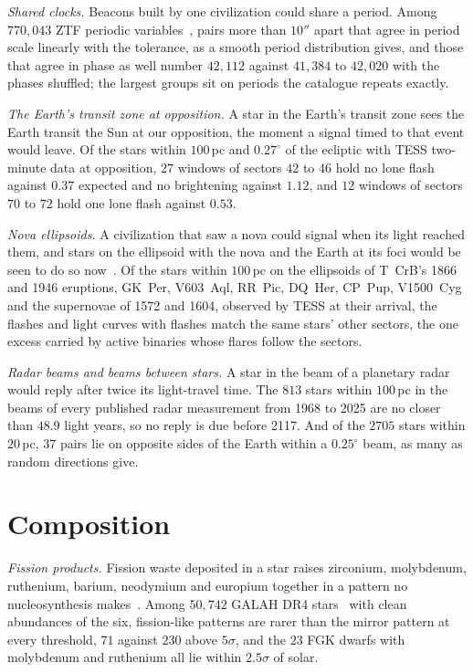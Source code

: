\documentclass[3p,11pt]{elsarticle}
\begin{document}
\emph{Shared clocks.} Beacons built by one civilization could share a period. Among
$770{,}043$ ZTF periodic variables~\cite{Chen2020}, pairs more than $10''$ apart that agree
in period scale linearly with the tolerance, as a smooth period distribution gives, and
those that agree in phase as well number $42{,}112$ against $41{,}384$ to $42{,}020$ with
the phases shuffled; the largest groups sit on periods the catalogue repeats exactly.

\emph{The Earth's transit zone at opposition.} A star in the Earth's transit zone sees the
Earth transit the Sun at our opposition, the moment a signal timed to that event would
leave. Of the stars within $100$\,pc and $0.27^\circ$ of the ecliptic with TESS two-minute
data at opposition, $27$ windows of sectors $42$ to $46$ hold no lone flash against $0.37$
expected and no brightening against $1.12$, and $12$ windows of sectors $70$ to $72$ hold
one lone flash against $0.53$.

\emph{Nova ellipsoids.} A civilization that saw a nova could signal when its light reached
them, and stars on the ellipsoid with the nova and the Earth at its foci would be seen to
do so now~\cite{Davenport2022,Cabrales2024}. Of the stars within $100$\,pc on the ellipsoids of T~CrB's
1866 and 1946 eruptions, GK~Per, V603~Aql, RR~Pic, DQ~Her, CP~Pup, V1500~Cyg and the
supernovae of 1572 and 1604, observed by TESS at their arrival, the flashes and light
curves with flashes match the same stars' other sectors, the one excess carried by
active binaries whose flares follow the sectors.

\emph{Radar beams and beams between stars.} A star in the beam of a planetary radar
would reply after twice its light-travel time. The $813$ stars within $100$\,pc in the
beams of every published radar measurement from 1968 to 2025 are no closer than
$48.9$ light years, so no reply is due before 2117. And of the $2705$ stars within
$20$\,pc, $37$ pairs lie on opposite sides of the Earth within a $0.25^\circ$ beam, as many
as random directions give.

\section{Composition}\label{sec:composition}

\emph{Fission products.} Fission waste deposited in a star raises zirconium, molybdenum,
ruthenium, barium, neodymium and europium together in a pattern no nucleosynthesis
makes~\cite{WhitmireWright1980}. Among $50{,}742$ GALAH DR4 stars~\cite{Buder2025} with clean
abundances of the six, fission-like patterns are rarer than the mirror pattern at every
threshold, $71$ against $230$ above $5\sigma$, and the $23$ FGK dwarfs with molybdenum and
ruthenium all lie within $2.5\sigma$ of solar.
\end{document}

